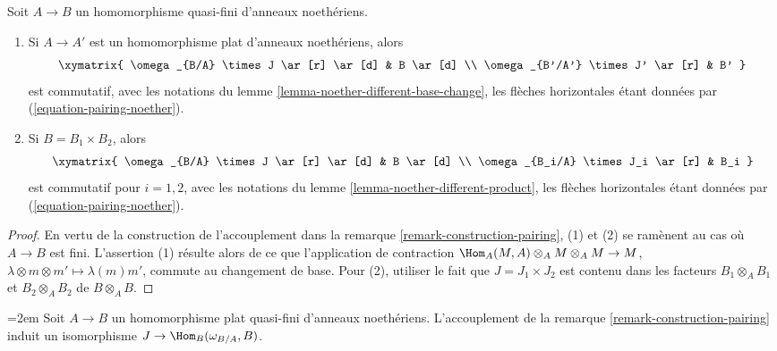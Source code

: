 \begin{lemma}
\label{lemma-noether-pairing-compatibilities}
Soit $A \to B$ un homomorphisme quasi-fini d'anneaux noethériens.
\begin{enumerate}
\item Si $A \to A'$ est un homomorphisme plat d'anneaux noethériens, alors
$$
\xymatrix{
\omega_{B/A} \times J \ar[r] \ar[d] & B \ar[d]  \\
\omega_{B'/A'} \times J' \ar[r] & B'
}
$$
est commutatif, avec les notations du
lemme \ref{lemma-noether-different-base-change},
les flèches horizontales étant données par
(\ref{equation-pairing-noether}).
\item Si $B = B_1 \times B_2$, alors
$$
\xymatrix{
\omega_{B/A} \times J \ar[r] \ar[d] & B \ar[d]  \\
\omega_{B_i/A} \times J_i \ar[r] & B_i
}
$$
est commutatif pour $i = 1, 2$, avec les notations du
lemme \ref{lemma-noether-different-product},
les flèches horizontales étant données par
(\ref{equation-pairing-noether}).
\end{enumerate}
\end{lemma}

\begin{proof}
En vertu de la construction de l'accouplement dans la
remarque \ref{remark-construction-pairing},
(1) et (2) se ramènent au cas où $A \to B$ est fini.
L'assertion (1) résulte alors de ce que l'application de contraction
$\Hom_A(M, A) \otimes_A M \otimes_A M \to M$,
$\lambda \otimes m \otimes m' \mapsto \lambda(m)m'$,
commute au changement de base. Pour (2), utiliser le fait que
$J = J_1 \times J_2$ est contenu dans les facteurs
$B_1 \otimes_A B_1$ et $B_2 \otimes_A B_2$
de $B \otimes_A B$.
\end{proof}

\begin{lemma}
\label{lemma-noether-pairing-flat-quasi-finite}
{\emergencystretch=2em Soit $A \to B$ un homomorphisme plat quasi-fini d'anneaux noethériens.
L'accouplement de la remarque \ref{remark-construction-pairing} induit un isomorphisme
$J \to \Hom_B(\omega_{B/A}, B)$.\par}
\end{lemma}

